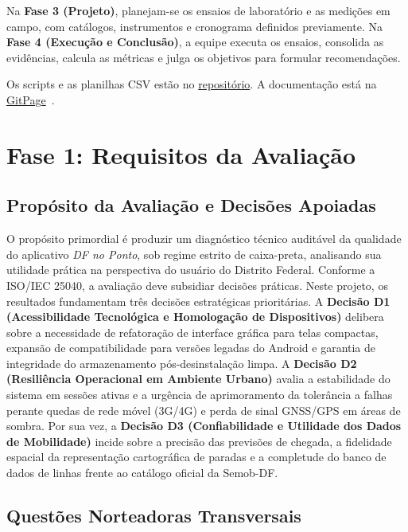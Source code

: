 \documentclass[11pt,a4paper]{article}
\begin{document}
Na \textbf{Fase 3 (Projeto)}, planejam-se os ensaios de laboratório e as medições em campo, com catálogos, instrumentos e cronograma definidos previamente. Na \textbf{Fase 4 (Execução e Conclusão)}, a equipe executa os ensaios, consolida as evidências, calcula as métricas e julga os objetivos para formular recomendações.

Os scripts e as planilhas CSV estão no \href{https://github.com/FCTE-Qualidade-de-Software-1/2026-2_T02_CAROL_SHAW}{repositório}. A documentação está na \href{https://fcte-qualidade-de-software-1.github.io/2026-2_T02_CAROL_SHAW/}{GitPage}~\cite{fcte2026}.

\section{Fase 1: Requisitos da Avaliação}
\label{sec:fase1}

\subsection{Propósito da Avaliação e Decisões Apoiadas}
\label{sec:proposito_decisoes}

O propósito primordial é produzir um diagnóstico técnico auditável da qualidade do aplicativo \textit{DF no Ponto}, sob regime estrito de caixa-preta, analisando sua utilidade prática na perspectiva do usuário do Distrito Federal. Conforme a ISO/IEC 25040, a avaliação deve subsidiar decisões práticas. Neste projeto, os resultados fundamentam três decisões estratégicas prioritárias. A \textbf{Decisão D1 (Acessibilidade Tecnológica e Homologação de Dispositivos)} delibera sobre a necessidade de refatoração de interface gráfica para telas compactas, expansão de compatibilidade para versões legadas do Android e garantia de integridade do armazenamento pós-desinstalação limpa. A \textbf{Decisão D2 (Resiliência Operacional em Ambiente Urbano)} avalia a estabilidade do sistema em sessões ativas e a urgência de aprimoramento da tolerância a falhas perante quedas de rede móvel (3G/4G) e perda de sinal GNSS/GPS em áreas de sombra. Por sua vez, a \textbf{Decisão D3 (Confiabilidade e Utilidade dos Dados de Mobilidade)} incide sobre a precisão das previsões de chegada, a fidelidade espacial da representação cartográfica de paradas e a completude do banco de dados de linhas frente ao catálogo oficial da Semob-DF.

\subsection{Questões Norteadoras Transversais}
\label{sec:questoes_norteadoras}
\end{document}
